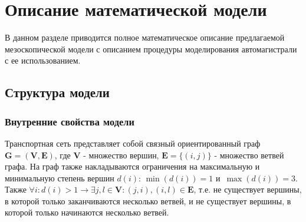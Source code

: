 \chapter{Описание математической модели}\label{ch:ch3}

В данном разделе приводится полное математическое описание предлагаемой мезоскопической модели с описанием процедуры моделирования автомагистрали с ее использованием.
\section{Структура модели}
\label{sec:model}
\subsection{Внутренние свойства модели}
\label{sec:graph_structure}
Транспортная сеть представляет собой связный ориентированный граф $\mathbf{G} = (\mathbf{V}, \mathbf{E})$,
где $\mathbf{V}$ - множество вершин, $\mathbf{E} = \{(i, j)\}$ - множество ветвей графа.
На граф также накладываются ограничения на максимальную и минимальную степень вершин $d(i)$: $\min(d(i)) = 1$ и~$\max(d(i)) = 3$.
Также $\forall i: d(i) > 1 \rightarrow \exists j, l \in \mathbf{V} : (j, i), (i, l) \in \mathbf{E}$, т.е. не существует вершины, в которой только заканчиваются несколько ветвей, и не существует вершины, в которой только начинаются несколько ветвей.

